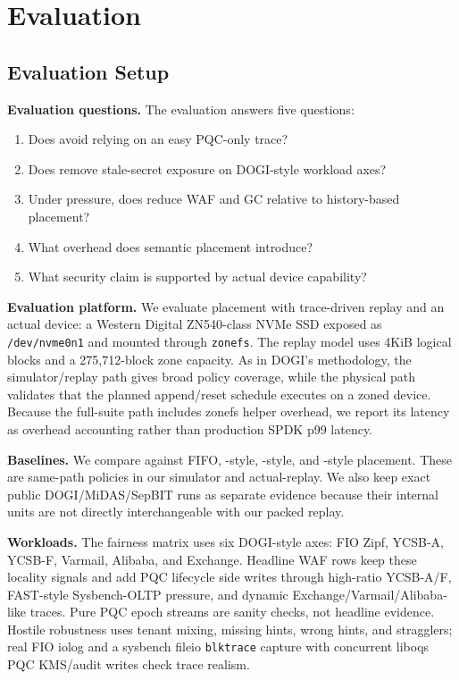 \section{Evaluation}

\subsection{Evaluation Setup}

\noindent\textbf{Evaluation questions.}
The evaluation answers five questions:

\begin{enumerate}[leftmargin=*]
\item Does \system avoid relying on an easy PQC-only trace?
\item Does \system remove stale-secret exposure on DOGI-style workload axes?
\item Under pressure, does \system reduce WAF and GC relative to history-based placement?
\item What overhead does semantic placement introduce?
\item What security claim is supported by actual device capability?
\end{enumerate}

\noindent\textbf{Evaluation platform.}
We evaluate placement with trace-driven replay and an actual \zns device: a Western Digital ZN540-class NVMe SSD exposed as \texttt{/dev/nvme0n1} and mounted through \texttt{zonefs}.  The replay model uses 4KiB logical blocks and a 275,712-block zone capacity.  As in DOGI's methodology, the simulator/replay path gives broad policy coverage, while the physical path validates that the planned append/reset schedule executes on a zoned device.  Because the full-suite path includes zonefs helper overhead, we report its latency as overhead accounting rather than production SPDK p99 latency.

\noindent\textbf{Baselines.}
We compare against FIFO, \sepbit-style, \midas-style, and \dogi-style placement.  These are same-path policies in our simulator and actual-\zns replay.  We also keep exact public DOGI/MiDAS/SepBIT runs as separate evidence because their internal units are not directly interchangeable with our packed \zns replay.

\noindent\textbf{Workloads.}
The fairness matrix uses six DOGI-style axes: FIO Zipf, YCSB-A, YCSB-F, Varmail, Alibaba, and Exchange.  Headline WAF rows keep these locality signals and add PQC lifecycle side writes through high-ratio YCSB-A/F, FAST-style Sysbench-OLTP pressure, and dynamic Exchange/Varmail/Alibaba-like traces.  Pure PQC epoch streams are sanity checks, not headline evidence.  Hostile robustness uses tenant mixing, missing hints, wrong hints, and stragglers; real FIO iolog and a sysbench fileio \texttt{blktrace} capture with concurrent liboqs PQC KMS/audit writes check trace realism.

